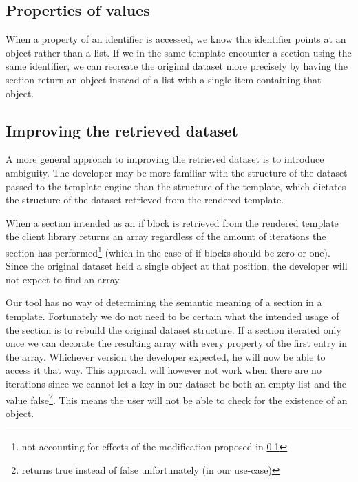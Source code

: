 \documentclass[thesis.tex]{subfiles}
\begin{document}
\subsection{Properties of values}
\label{sec:flatten-section}
When a property of an identifier is accessed, we know this identifier points at
an object rather than a list. If we in the same template encounter a section
using the same identifier, we can recreate the original dataset more precisely
by having the section return an object instead of a list with a single item
containing that object.

\subsection{Improving the retrieved dataset}
A more general approach to improving the retrieved dataset is to introduce
ambiguity. The developer may be more familiar with the structure of the dataset
passed to the template engine than the structure of the template, which dictates
the structure of the dataset retrieved from the rendered template.

When a section intended as an if block is retrieved from the rendered template
the client library returns an array regardless of the amount of iterations the
section has performed\footnote{
	not accounting for effects of the modification proposed in \ref{sec:flatten-section}
} (which in the case of if blocks should be zero or one).
Since the original dataset held a single object at that position,
the developer will not expect to find an array.

Our tool has no way of determining the semantic meaning of a section in a
template.
Fortunately we do not need to be certain what the intended usage of the section
is to rebuild the original dataset structure.
If a section iterated only once we can decorate the resulting array with every
property of the first entry in the array. Whichever version the developer
expected, he will now be able to access it that way. This approach will however
not work when there are no iterations since we cannot let a key in our dataset
be both an empty list and the value false\footnote{
	\inline{\!\![]} returns true instead of false unfortunately (in our use-case)
}. This means the user will not be able to check for the existence of an object.

\end{document}
